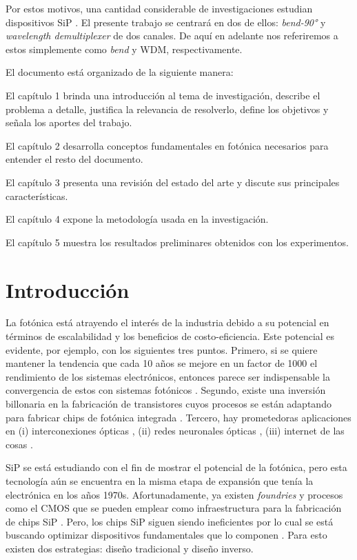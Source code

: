 Por estos motivos, una cantidad considerable de investigaciones estudian dispositivos SiP \citep{Molesky2018}.
El presente trabajo se centrará en dos de ellos: \emph{bend-90°} y \emph{wavelength demultiplexer} de dos canales.
De aquí en adelante nos referiremos a estos simplemente como \emph{bend} y WDM, respectivamente.


El documento está organizado de la siguiente manera:

El capítulo 1 brinda una introducción al tema de investigación, describe el problema a detalle, justifica la relevancia de resolverlo, define los objetivos y señala los aportes del trabajo.

El capítulo 2 desarrolla conceptos fundamentales en fotónica necesarios para entender el resto del documento.

El capítulo 3 presenta una revisión del estado del arte y discute sus principales características.

El capítulo 4 expone la metodología usada en la investigación.

El capítulo 5 muestra los resultados preliminares obtenidos con los experimentos.

\section{Introducción}

La fotónica está atrayendo el interés de la industria debido a su potencial en términos de escalabilidad y los beneficios de costo-eficiencia. 
Este potencial es evidente, por ejemplo, con los siguientes tres puntos. 
Primero, si se quiere mantener la tendencia que cada 10 años se mejore en un factor de 1000 el rendimiento de los sistemas electrónicos, entonces parece ser indispensable la convergencia de estos con sistemas fotónicos \citep{Glick2018}. 
Segundo, existe una inversión billonaria en la fabricación de transistores cuyos procesos se están adaptando para fabricar chips de fotónica integrada \citep{LukasChrostowski2010}.
Tercero, hay prometedoras aplicaciones en (i) interconexiones ópticas \citep{Shen2019}, (ii) redes neuronales ópticas \citep{Shen2017}, (iii) internet de las cosas \citep{Glick2018}.
 

SiP se está estudiando con el fin de mostrar el potencial de la fotónica, pero esta tecnología aún se encuentra en la misma etapa de expansión que tenía la electrónica en los años 1970s.
Afortunadamente, ya existen \emph{foundries} y procesos como el CMOS que se pueden emplear como infraestructura para la fabricación de chips SiP \citep{LukasChrostowski2010}.
Pero, los chips SiP siguen siendo ineficientes por lo cual se está buscando optimizar dispositivos fundamentales que lo componen \citep{Vuckovic2019}.
Para esto existen dos estrategias: diseño tradicional y diseño inverso.


